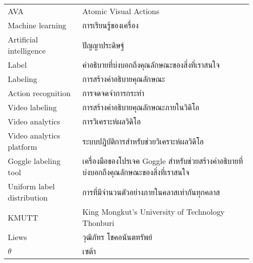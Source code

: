 \begin{abbreviations}
    \noindent
    \begin{tabular*}{\textwidth}{@{}p{}p{}@{}}
        {AVA} & {Atomic Visual Actions} \\
        {Machine learning} & {การเรียนรู้ของเครื่อง} \\
        {Artificial intelligence} & {ปัญญาประดิษฐ์} \\
        {Label} & {คำอธิบายที่บ่งบอกถึงคุณลักษณะของสิ่งที่เราสนใจ} \\
        {Labeling} & {การสร้างคำอธิบายคุณลักษณะ} \\
        {Action recognition} & {การจดจดจำการกระทำ} \\
        {Video labeling} & {การสร้างคำอธิบายคุณลักษณะภายในวิดิโอ} \\
        {Video analytics} & {การวิเคราะห์ผลวิดิโอ} \\
	{Video analytics platform} & {ระบบปฎิบัติการสำหรับช่วยวิเคราะห์ผลวิดิโอ} \\
        {Goggle labeling tool} & {เครื่องมือของโปรเจค Goggle สำหรับช่วยสร้างคำอธิบายที่บ่งบอกถึงคุณลักษณะของสิ่งที่เราสนใจ} \\
        {Uniform label distribution} & {การที่มีจำนวนตัวอย่างภายในคลาสเท่ากันทุกคลาส} \\
        {KMUTT} & {King Mongkut's University of Technology Thonburi} \\
        {Liews} & {วุฒิภัทร โชคอนันตทรัพย์} \\
        {$\theta$} & {เซต้า}
    \end{tabular*}
\end{abbreviations}
